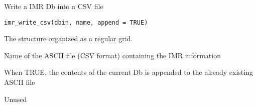 %
\begin{Description}\relax
Write a IMR Db into a CSV file
\end{Description}
%
\begin{Usage}
\begin{verbatim}
imr_write_csv(dbin, name, append = TRUE)
\end{verbatim}
\end{Usage}
%
\begin{Arguments}
\begin{ldescription}
\item[\code{dbin}] 
The  structure organized as a regular grid.

\item[\code{name}] 
Name of the ASCII file (CSV format) containing the IMR information

\item[\code{append}] 
When TRUE, the contents of the current Db is appended to the already
existing ASCII file

\end{ldescription}
\end{Arguments}
%
\begin{Value}
Unused
\end{Value}
